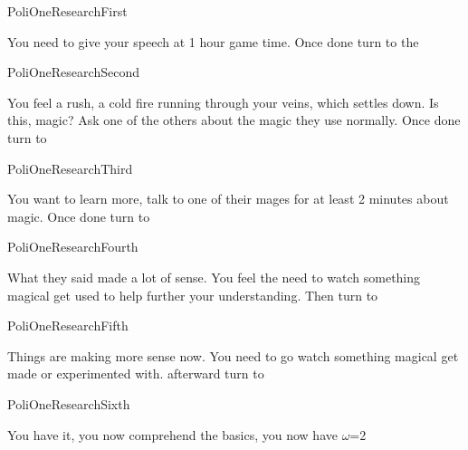 \documentclass[greennotebook]{guildcamp3} %
\begin{document}
\startnotebook{\nPoliOneResearch{}}

\begin{page}{PoliOneResearchFirst}
	
You need to give your speech at 1 hour game time. Once done turn to the 
	
\end{page}

\begin{page}{PoliOneResearchSecond}
	
You feel a rush, a cold fire running through your veins, which settles down. Is this, magic? Ask one of the others about the magic they use normally. Once done turn to 

	
\end{page}

\begin{page}{PoliOneResearchThird}
	
You want to learn more, talk to one of their mages for at least 2 minutes about magic. Once done turn to 
	
\end{page}

\begin{page}{PoliOneResearchFourth}
	
	What they said made a lot of sense. You feel the need to watch something magical get used to help further your understanding. Then turn to 
	
\end{page}

\begin{page}{PoliOneResearchFifth}
	
	Things are making more sense now. You need to go watch something magical get made or experimented with. afterward turn to  
	
\end{page}



\begin{page}{PoliOneResearchSixth}
	
	You have it, you now comprehend the basics, you now have {$\omega$}={2}
	
\end{page}

\endnotebook
\end{document}
